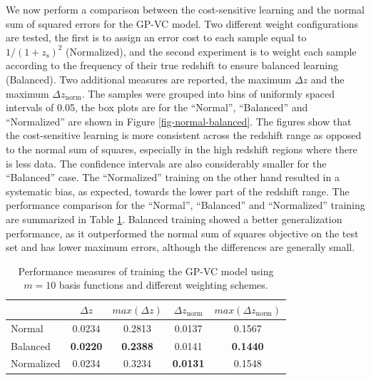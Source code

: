 \documentclass[useAMS,usenatbib,fleqn]{mn2e}
\begin{document}
We now perform a comparison between the cost-sensitive learning and the normal sum of squared errors for the GP-VC model. Two different weight configurations are tested, the first is to assign an error cost to each sample equal to $1/\left(1+z_\textrm{s}\right)^{2}$ (Normalized), and the second experiment is to weight each sample according to the frequency of their true redshift to ensure balanced learning (Balanced).  Two additional measures are reported, the maximum $\Delta z$ and the maximum $\Delta z_\textrm{norm}$. The samples were grouped into bins of uniformly spaced intervals of 0.05, the box plots are for the ``Normal'', ``Balanced'' and ``Normalized'' are shown in Figure \ref{fig-normal-balanced}. The figures show that the cost-sensitive learning is more consistent across the redshift range as opposed to the normal sum of squares, especially in the high redshift regions where there is less data. The confidence intervals are also considerably smaller for the ``Balanced'' case. The ``Normalized'' training on the other hand resulted in a systematic bias, as expected, towards the lower part of the redshift range. The performance comparison for the ``Normal'', ``Balanced'' and ``Normalized'' training are summarized in Table \ref{table-normal-balanced}. Balanced training showed a better generalization performance, as it outperformed the normal sum of squares objective on the test set and has lower maximum errors, although the differences are generally small.

 \begin{table}
\caption{Performance measures of training the GP-VC model using $m=10$ basis functions and different weighting schemes.}
\begin{center}
  \begin{tabular}{| l | c | c | c | c |}
     				&	$\Delta z$		&	$max\left(\Delta z\right)$		&	$\Delta z_\textrm{norm}$		&	$max\left(\Delta z_\textrm{norm}\right)$	\\	\hline
	Normal			&	0.0234			&	0.2813							&	0.0137							&	0.1567				\\
	Balanced		&	\textbf{0.0220}	&	\textbf{0.2388}					&	0.0141							&	\textbf{0.1440}			\\
	Normalized		&	0.0234			&	0.3234							&	\textbf{0.0131}					&	0.1548				\\	\hline
  \end{tabular}
\end{center}
\label{table-normal-balanced}
\end{table}
\end{document}
